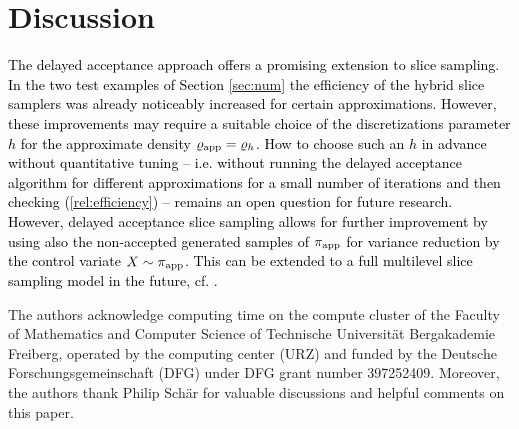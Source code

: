 \documentclass[sn-mathphys-num]{sn-jnl}%
\theoremstyle{thmstyleone}%
\theoremstyle{thmstyletwo}%
\theoremstyle{thmstylethree}%
\newcommand{\rhoapp}{\varrho_{{\rm app}}}
\newcommand{\rev}[1]{\textcolor{black}{#1}}
\newcommand{\change}[1]{\bgroup\color{black}#1\egroup}    %
\begin{document}

\section{Discussion}\label{sec:concl}
\rev{The delayed acceptance approach offers a promising extension to slice sampling. In the two test examples of Section \ref{sec:num} the efficiency of the hybrid slice samplers was already noticeably increased for certain approximations. However, these improvements may require a suitable choice of the discretizations parameter $h$ for the approximate density $\rhoapp = \varrho_h$. How to choose such an $h$ in advance without quantitative tuning -- i.e. without running the delayed acceptance algorithm for different approximations for a small number of iterations and then checking (\ref{rel:efficiency}) -- remains an open question for future research. However, delayed acceptance slice sampling allows for further improvement by using also the non-accepted generated samples of $\pi_{\rm app}$ for variance reduction by the control variate $X\sim\pi_{\rm app}$. This can be extended to a full multilevel slice sampling model in the future, cf. \cite{LykkegaardEtAl2022}.} 


\change{The authors acknowledge computing time on the compute cluster of the Faculty of Mathematics and Computer Science of Technische Universität Bergakademie Freiberg, operated by the computing center (URZ) and funded by the Deutsche Forschungsgemeinschaft (DFG) under DFG grant number 397252409. Moreover, the} authors thank Philip Schär for valuable discussions and helpful comments on this paper.
\end{document}
